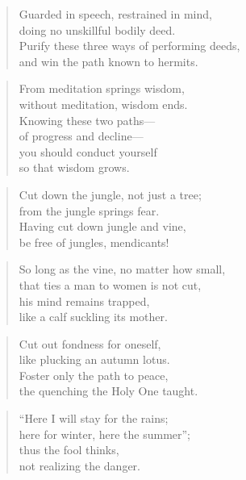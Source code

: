 \documentclass[12pt,openany]{book}%
\begin{document}
\begin{verse}%
Guarded in speech, restrained in mind, \\
doing no unskillful bodily deed. \\
Purify these three ways of performing deeds, \\
and win the path known to hermits. 

%
\end{verse}

\begin{verse}%
From meditation springs wisdom, \\
without meditation, wisdom ends. \\
Knowing these two paths—\\
of progress and decline—\\
you should conduct yourself \\
so that wisdom grows. 

%
\end{verse}

\begin{verse}%
Cut down the jungle, not just a tree; \\
from the jungle springs fear. \\
Having cut down jungle and vine, \\
be free of jungles, mendicants! 

%
\end{verse}

\begin{verse}%
So long as the vine, no matter how small, \\
that ties a man to women is not cut, \\
his mind remains trapped, \\
like a calf suckling its mother. 

%
\end{verse}

\begin{verse}%
Cut out fondness for oneself, \\
like plucking an autumn lotus. \\
Foster only the path to peace, \\
the quenching the Holy One taught. 

%
\end{verse}

\begin{verse}%
“Here I will stay for the rains; \\
here for winter, here the summer”; \\
thus the fool thinks, \\
not realizing the danger. 

%
\end{verse}
\end{document}
